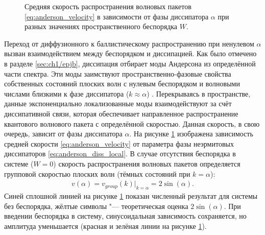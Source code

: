\begin{figure}[h]
	\caption[Скорость распространения волновых пакетов в зависимости от параметров неэрмитовой диссипации]{
		Средняя скорость распространения волновых пакетов \cref{eq:anderson_velocity} в зависимости от фазы диссипатора \(\alpha\) при разных значениях пространственного беспорядка \(W\).
	}
	\label{fig:anderson_prb_4}
\end{figure}

Переход от диффузионного к баллистическому распространению при ненулевом \(\alpha\) вызван взаимодействием между беспорядком и диссипацией. 
Как было отмечено в разделе \cref{sec:ch1/epjb}, диссипация отбирает моды Андерсона из определённой части спектра. 
Эти моды заимствуют пространственно-фазовые свойства собственных состояний плоских волн с нулевым беспорядком и волновыми числами близкими к фазе диссипатора (\(k\approx \alpha\)) \cite{Vershinina2017, Ishii1973}. 
Перекрываясь в пространстве, данные экспоненциально локализованные моды взаимодействуют за счёт диссипативной связи, которая обеспечивает направленное распространение квантового волнового пакета с определённой скоростью. 
Данная скорость, в свою очередь, зависит от фазы диссипатора \(\alpha\). 
На рисунке \cref{fig:anderson_prb_4} изображена зависимость средней скорости \cref{eq:anderson_velocity} от параметра фазы неэрмитовых диссипаторов \cref{eq:anderson_diss_local}. В случае отсутствия беспорядка в системе (\(W=0\)) скорость распространения волновых пакетов определяется групповой скоростью плоских волн (тёмных состояний при \(k=\alpha\)):
\begin{equation}
\label{eq:anderson_velocity_sin}
\begin{gathered}
v(\alpha) = v_{group}(k)|_{k=\alpha} = 2 \sin(\alpha) .
\end{gathered}
\end{equation}
Синей сплошной линией на рисунке \cref{fig:anderson_prb_4} показан численный результат для системы без беспорядка, жёлтые символы "--- теоретическая оценка \(2 \sin(\alpha)\). 
При введении беспорядка в систему, синусоидальная зависимость сохраняется, но амплитуда уменьшается (красная и зелёная линии на рисунке \cref{fig:anderson_prb_4}).

